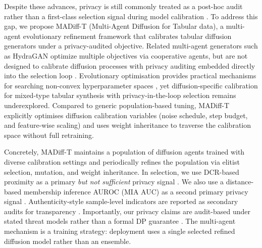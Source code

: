 \documentclass[preprint,12pt]{elsarticle}
\begin{document}
Despite these advances, privacy is still commonly treated as a post-hoc audit rather than a first-class selection signal during model calibration \cite{Hernandez2025}. To address this gap, we propose MADiff-T (Multi-Agent Diffusion for Tabular data), a multi-agent evolutionary refinement framework that calibrates tabular diffusion generators under a privacy-audited objective. Related multi-agent generators such as HydraGAN optimize multiple objectives via cooperative agents, but are not designed to calibrate diffusion processes with privacy auditing embedded directly into the selection loop \cite{DeSmetCook2024}. Evolutionary optimisation provides practical mechanisms for searching non-convex hyperparameter spaces \cite{Back1996,Hansen2001}, yet diffusion-specific calibration for mixed-type tabular synthesis with privacy-in-the-loop selection remains underexplored. Compared to generic population-based tuning, MADiff-T explicitly optimises diffusion calibration variables (noise schedule, step budget, and feature-wise scaling) and uses weight inheritance to traverse the calibration space without full retraining.

Concretely, MADiff-T maintains a population of diffusion agents trained with diverse calibration settings and periodically refines the population via elitist selection, mutation, and weight inheritance. In selection, we use DCR-based proximity as a primary \emph{but not sufficient} privacy signal \cite{yao2025dcr_delusion}. We also use a distance-based membership inference AUROC (MIA AUC) as a second primary privacy signal \cite{Hayes2019,ZhangMalin2022}. Authenticity-style sample-level indicators are reported as secondary audits for transparency \cite{Alaa2022}. Importantly, our privacy claims are audit-based under stated threat models rather than a formal DP guarantee \cite{lautrup2025syntheval}. The multi-agent mechanism is a training strategy: deployment uses a single selected refined diffusion model rather than an ensemble.
\end{document}
